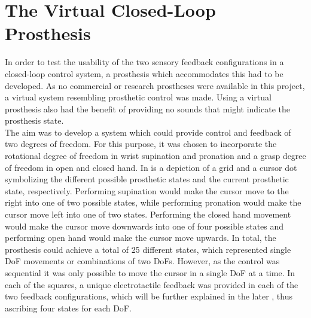 
\section{The Virtual Closed-Loop Prosthesis} \label{sec:vp}

In order to test the usability of the two sensory feedback configurations in a closed-loop control system, a prosthesis which accommodates this had to be developed. As no commercial or research prostheses were available in this project, a virtual system resembling prosthetic control was made. Using a virtual prosthesis also had the benefit of providing no sounds that might indicate the prosthesis state. \\
The aim was to develop a system which could provide control and feedback of two degrees of freedom. For this purpose, it was chosen to incorporate the rotational degree of freedom in wrist supination and pronation and a grasp degree of freedom in open and closed hand. In  is a depiction of a grid and a cursor dot symbolizing the different possible prosthetic states and the current prosthetic state, respectively. Performing supination would make the cursor move to the right into one of two possible states, while performing pronation would make the cursor move left into one of two states. Performing the closed hand movement would make the cursor move downwards into one of four possible states and performing open hand would make the cursor move upwards. In total, the prosthesis could achieve a total of 25 different states, which represented single DoF movements or combinations of two DoFs. However, as the control was sequential it was only possible to move the cursor in a single DoF at a time. In each of the squares, a unique electrotactile feedback was provided in each of the two feedback configurations, which will be further explained in the later , thus ascribing four states for each DoF.      
     

